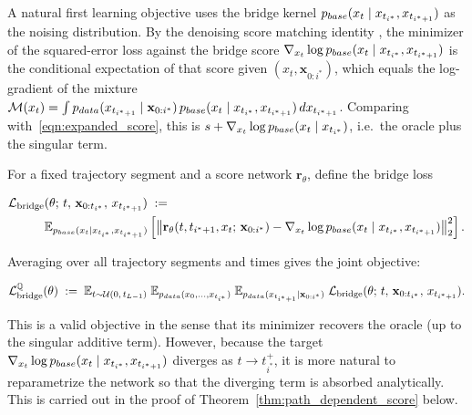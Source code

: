 \documentclass{article}
\newcommand{\pdata}{p_{\normalfont{data}}}
\newcommand{\pbase}{p_{\normalfont{base}}}
\newcommand{\QQ}{\mathbb{Q}}
\newcommand{\EE}{\mathbb{E}}
\begin{document}
A natural first learning objective uses the bridge kernel $\pbase(x_t \mid x_{t_{i^*}}, x_{t_{i^*+1}})$ as the noising distribution.  By the denoising score matching identity \cite{vincent2011connection}, the minimizer of the squared-error loss against the bridge score $\nabla_{x_t}\log\pbase(x_t \mid x_{t_{i^*}}, x_{t_{i^*+1}})$ is the conditional expectation of that score given $(x_t, \mathbf{x}_{0:i^*})$, which equals the log-gradient of the mixture $\mathcal{M}(x_t) = \int \pdata(x_{t_{i^*+1}} \mid \mathbf{x}_{0:i^*})\,\pbase(x_t \mid x_{t_{i^*}}, x_{t_{i^*+1}})\,dx_{t_{i^*+1}}$.  Comparing with~\eqref{eqn:expanded_score}, this is $s + \nabla_{x_t}\log\pbase(x_t \mid x_{t_{i^*}})$, i.e.\ the oracle plus the singular term.

For a fixed trajectory segment and a score network $\mathbf{r}_\theta$, define the bridge loss

\begin{align}
  \mathcal{L}_\text{bridge}&(\theta;\, t,\, \mathbf{x}_{0:t_{i^*}},\, x_{t_{i^*+1}})
  \;:=\; \nonumber \\
  &\EE_{\pbase(x_t \mid x_{t_{i^*}}, x_{t_{i^*+1}})}\left[
    \bigl\|\mathbf{r}_\theta(t, t_{i^*+1}, x_t;\, \mathbf{x}_{0:i^*})
    - \nabla_{x_t}\log \pbase(x_t \mid x_{t_{i^*}}, x_{t_{i^*+1}})\bigr\|_2^2
  \right].\label{eqn:dsm_fixed_traj}
\end{align}

Averaging over all trajectory segments and times gives the joint objective:

\begin{equation}\label{eqn:dsm_joint_conditioned_objective}
  \mathcal{L}_\text{bridge}^\QQ(\theta)
  \;:=\;
  \EE_{t \sim \mathcal{U}(0,\,t_{L-1})}\;
  \EE_{\pdata(x_0, \ldots, x_{t_{i^*}})}\;
  \EE_{\pdata(x_{t_{i^*+1}} \mid \mathbf{x}_{0:i^*})}\;
  \mathcal{L}_\text{bridge}(\theta;\, t,\, \mathbf{x}_{0:t_{i^*}},\, x_{t_{i^*+1}}).
\end{equation}

This is a valid objective in the sense that its minimizer recovers the oracle (up to the singular additive term).  However, because the target $\nabla_{x_t}\log\pbase(x_t \mid x_{t_{i^*}}, x_{t_{i^*+1}})$ diverges as $t \to t_{i^*}^+$, it is more natural to reparametrize the network so that the diverging term is absorbed analytically.  This is carried out in the proof of Theorem~\ref{thm:path_dependent_score} below.

\end{document}
